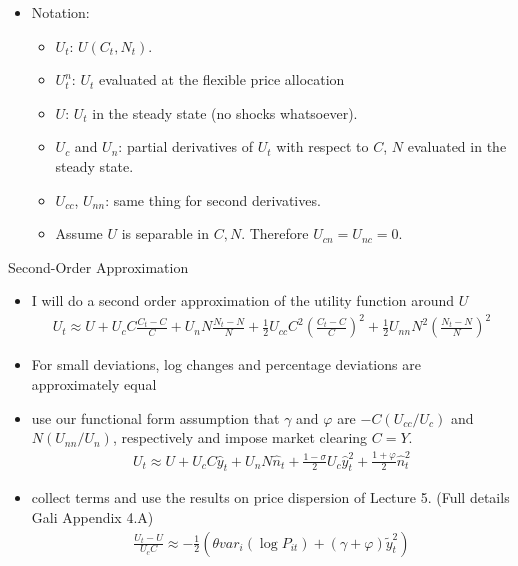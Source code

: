 \documentclass[11pt,aspectratio=169,xcolor={dvipsnames},hyperref={pdftex,pdfpagemode=UseNone,hidelinks,pdfdisplaydoctitle=true},usepdftitle=false]{beamer}
\begin{document}
\begin{frame}
\begin{itemize}
\item Notation:
\begin{itemize}
\item $U_t$: $U(C_t,N_t)$.
\item $U_t^n$: $U_t$ evaluated at the flexible price allocation
\item $U$: $U_t$ in the steady state (no shocks whatsoever).
\item $U_c$ and $U_n$: partial derivatives of $U_t$ with respect to $C$, $N$ evaluated in the steady state. 
\item $U_{cc}$, $U_{nn}$: same thing for second derivatives.
\item Assume $U$ is separable in $C,N$. Therefore $U_{cn} = U_{nc} = 0$.
\end{itemize}
\end{itemize}
\end{frame}


\begin{frame}{Second-Order Approximation}
\begin{itemize}
\item I will do a second order approximation of the utility function around $U$
\begin{align*}
U_t \approx U + U_c C \frac{C_t - C}{C} + U_n N \frac{N_t - N}{N} + \frac{1}{2} U_{cc} C^2 \left(\frac{C_t - C}{C}\right)^2 + \frac{1}{2} U_{nn} N^2 \left(\frac{N_t - N}{N}\right)^2 
\end{align*}
\item For small deviations, log changes and percentage deviations are approximately equal
\item use our functional form assumption that $\gamma$ and $\varphi$ are $-C (U_{cc}/U_c)$ and $N (U_{nn}/U_n)$, respectively and impose market clearing $C = Y$.
\begin{align*}
U_t \approx U + U_c C \hat{y}_t + U_n N \hat{n}_t + \frac{1-\sigma}{2} U_{c}  \hat{y}^2_t + \frac{1+\varphi}{2} \hat{n}^2_t
\end{align*}
\item collect terms and use the results on price dispersion of Lecture 5. (Full details Gali Appendix 4.A)
\begin{align*}
\frac{U_t - U}{U_c C} \approx -\frac{1}{2} \left(\theta var_i ( \log P_{it}) + (\gamma + \varphi) \tilde{y}^2_t \right)
\end{align*}
\end{itemize}
\end{frame}
\end{document}
